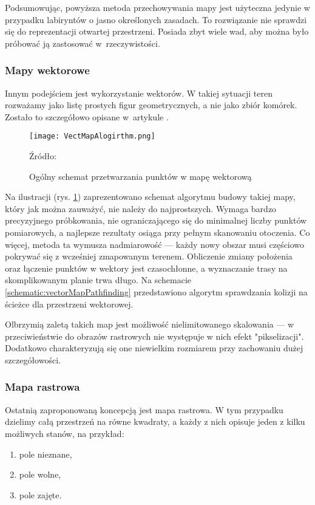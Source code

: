             Podsumowując, powyższa metoda przechowywania mapy jest użyteczna jedynie w przypadku labiryntów o jasno określonych zasadach.
            To rozwiązanie nie sprawdzi się do reprezentacji otwartej przestrzeni.
            Posiada zbyt wiele wad, aby można było próbować ją zastosować w~rzeczywistości.

        \subsubsection{Mapy wektorowe}
            Innym podejściem jest wykorzystanie wektorów.
            W takiej sytuacji teren rozważamy jako listę prostych figur geometrycznych, a nie jako zbiór komórek.
            Zostało to szczegółowo opisane w~artykule \cite{vector_map}.

            \begin{figure}[!ht]
                \centering
                \texttt{[image: VectMapAlogirthm.png]}
                \caption{Ogólny schemat przetwarzania punktów w mapę wektorową}
                Źródło: \cite{vector_map}
                \label{fig:buildVectMap}
            \end{figure}

            Na ilustracji (rys. \ref{fig:buildVectMap}) zaprezentowano schemat algorytmu budowy takiej mapy, który jak można zauważyć, nie należy do najprostszych.
            Wymaga bardzo precyzyjnego próbkowania, nie ograniczającego się do minimalnej liczby punktów pomiarowych, a najlepsze rezultaty osiąga przy pełnym skanowaniu otoczenia.
            Co więcej, metoda ta wymusza nadmiarowość — każdy nowy obszar musi częściowo pokrywać się z wcześniej zmapowanym terenem.
            Obliczenie zmiany położenia oraz łączenie punktów w wektory jest czasochłonne, a wyznaczanie trasy na skomplikowanym planie trwa długo.
            Na schemacie \ref{schematic:vectorMapPathfinding} przedstawiono algorytm sprawdzania kolizji na ścieżce dla przestrzeni wektorowej.

            


            Olbrzymią zaletą takich map jest możliwość nielimitowanego skalowania — w przeciwieństwie do obrazów rastrowych nie występuje w nich efekt "pikselizacji".
            Dodatkowo charakteryzują się one niewielkim rozmiarem przy zachowaniu dużej szczegółowości.


\newpage
        \subsubsection{Mapa rastrowa}
            Ostatnią zaproponowaną koncepcją jest mapa rastrowa.
            W tym przypadku dzielimy całą przestrzeń na równe kwadraty, a każdy z nich opisuje jeden z kilku możliwych stanów,
            na przykład:
            \begin{enumerate}
                \item pole nieznane,
                \item pole wolne,
                \item pole zajęte.
            \end{enumerate}

